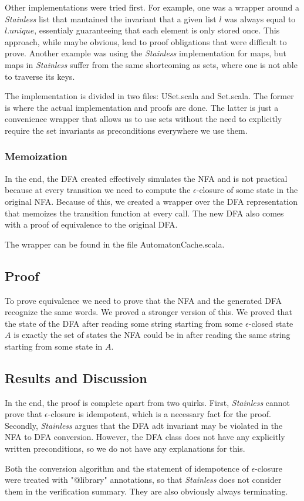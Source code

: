 \documentclass[12pt, a4paper]{article}
\theoremstyle{break}
\begin{document}
Other implementations were tried first. For example, one was a wrapper around a
\textit{Stainless} list that mantained the invariant that a given list $l$ was
always equal to $l.unique$, essentialy guaranteeing that each element is only
stored once. This approach, while maybe obvious, lead to proof obligations that
were difficult to prove. Another example was using the \textit{Stainless}
implementation for maps, but maps in \textit{Stainless} suffer from the same
shortcoming as sets, where one is not able to traverse its keys.

The implementation is divided in two files: USet.scala and Set.scala. The former
is where the actual implementation and proofs are done. The latter is just a
convenience wrapper that allows us to use sets without the need to explicitly
require the set invariants as preconditions everywhere we use them.

\subsubsection{Memoization}

In the end, the DFA created effectively simulates the NFA and is not practical
because at every transition we need to compute the $\epsilon$-closure of some
state in the original NFA. Because of this, we created a wrapper over the DFA
representation that memoizes the transition function at every call. The new DFA
also comes with a proof of equivalence to the original DFA.

The wrapper can be found in the file AutomatonCache.scala.

\subsection{Proof}

To prove equivalence we need to prove that the NFA and the generated DFA
recognize the same words. We proved a stronger version of this. We proved that
the state of the DFA after reading some string starting from some
$\epsilon$-closed state $A$ is exactly the set of states the NFA could be in
after reading the same string starting from some state in $A$.

\subsection{Results and Discussion}

In the end, the proof is complete apart from two quirks. First,
\textit{Stainless} cannot prove that $\epsilon$-closure is idempotent, which is
a necessary fact for the proof. Secondly, \textit{Stainless} argues that the DFA
adt invariant may be violated in the NFA to DFA conversion. However, the DFA
class does not have any explicitly written preconditions, so we do not have any
explanations for this.

Both the conversion algorithm and the statement of idempotence of
$\epsilon$-closure were treated with "@library" annotations, so that
\textit{Stainless} does not consider them in the verification summary. They are
also obviously always terminating.
\end{document}
